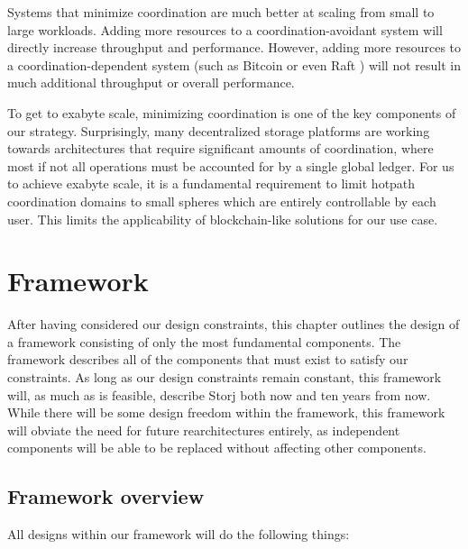 \documentclass[8pt,fleqn,openany]{book}
\begin{document}
Systems that minimize coordination are
much better at scaling from small
to large workloads. Adding more resources to a coordination-avoidant system
will directly increase throughput and performance. However,
adding more resources to a coordination-dependent system
(such as Bitcoin \cite{bitcoin} or even Raft \cite{raft}) will not result in
much additional throughput or overall performance.

To get to exabyte scale, minimizing coordination is one of the key components
of our strategy.
Surprisingly, many decentralized storage platforms are working towards
architectures that require significant amounts of coordination,
where most if not all operations must be accounted for by a single global
ledger. For us to achieve exabyte scale, it is a fundamental requirement to
limit hotpath coordination domains to small spheres which are entirely
controllable by each user.
This limits the applicability of blockchain-like solutions for our use case.

\chapter{Framework}\label{chap:framework}

After having considered our design constraints, this chapter outlines the
design of a framework consisting of only the most fundamental components.
The framework describes
all of the components that must exist to satisfy our constraints.
As long as our design constraints remain constant, this framework will, as
much as is feasible, describe Storj both now and ten years from now.
While there will be some design freedom within the framework,
this framework will obviate the need for future rearchitectures entirely, as
independent components will be able to be replaced without affecting other
components.

\section{Framework overview}

All designs within our framework will do the following things:
\end{document}
